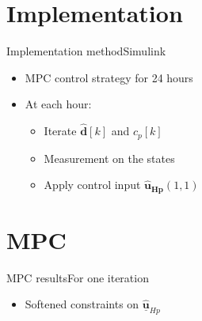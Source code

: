 \section{Implementation}

\begin{frame}{Implementation method}{Simulink}
\begin{itemize}
\item<1-> MPC control strategy for 24 hours
\item<1-> At each hour:
	 	\begin{itemize}
	 	\item<1-> Iterate $\hat{\pmb{d}}[k]$ and $c_p [k]$
	 	\item<1-> Measurement on the states 
	 	\item<1-> Apply control input $\pmb{\hat{u}_{Hp}}(1,1)$
	 	\end{itemize}
\end{itemize}

\begin{figure}[H]
\centering
 
\end{figure}

\end{frame}


\section{MPC}

\begin{frame}{MPC results}{For one iteration}

\begin{itemize}
	 	\item<1-> Softened constraints on $\hat{\pmb{\underline{u}}}_{Hp}$
	 	\end{itemize}

\begin{figure}[H]
   \centering
    
\end{figure}

\end{frame}


